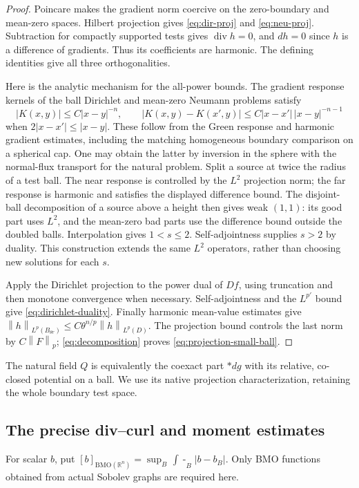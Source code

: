 \documentclass[reqno,11pt]{amsart}
\numberwithin{equation}{section}
\theoremstyle{definition}
\theoremstyle{remark}
\newcommand{\R}{\mathbb R}
\newcommand{\BMO}{\mathrm{BMO}}
\newcommand{\diver}{\operatorname{div}}
\newcommand{\fint}{\mathop{\int\!\!\!\!-}}
\newcommand{\norm}[1]{\left\lVert#1\right\rVert}
\begin{document}
\begin{proof}
Poincare makes the gradient norm coercive on the zero-boundary and
mean-zero spaces. Hilbert projection gives \eqref{eq:dir-proj} and
\eqref{eq:neu-proj}. Subtraction for compactly supported tests gives
$\diver h=0$, and $dh=0$ since $h$ is a difference of gradients.
Thus its coefficients are harmonic. The defining identities give all
three orthogonalities.

Here is the analytic mechanism for the all-power bounds. The gradient
response kernels of the ball Dirichlet and mean-zero Neumann problems
satisfy
\[
 |K(x,y)|\leq C|x-y|^{-n},\qquad
 |K(x,y)-K(x',y)|\leq C|x-x'|\,|x-y|^{-n-1}
\]
when $2|x-x'|\leq|x-y|$. These follow from the Green response and
harmonic gradient estimates, including the matching homogeneous boundary
comparison on a spherical cap. One may obtain the latter by inversion
in the sphere with the normal-flux transport for the natural problem.
Split a source at twice the radius of a test ball. The near response is
controlled by the $L^2$ projection norm; the far response is harmonic
and satisfies the displayed difference bound. The disjoint-ball
decomposition of a source above a height then gives weak $(1,1)$:
its good part uses $L^2$, and the mean-zero bad parts use the difference
bound outside the doubled balls. Interpolation gives $1<s\leq2$.
Self-adjointness supplies $s>2$ by duality. This construction extends
the same $L^2$ operators, rather than choosing new solutions for each $s$.

Apply the Dirichlet projection to the power dual of $Df$, using
truncation and then monotone convergence when necessary. Self-adjointness
and the $L^{p'}$ bound give \eqref{eq:dirichlet-duality}.
Finally harmonic mean-value estimates give
$\norm h_{L^p(B_{\theta r})}\leq C\theta^{n/p}\norm h_{L^p(D)}$.
The projection bound controls the last norm by $C\norm F_p$;
\eqref{eq:decomposition} proves \eqref{eq:projection-small-ball}.
\end{proof}

The natural field $Q$ is equivalently the coexact part $*dg$ with its
relative, co-closed potential on a ball. We use its native projection
characterization, retaining the whole boundary test space.

\subsection{The precise div--curl and moment estimates}\label{sec:compensation}
For scalar $b$, put
$[b]_{\BMO(\R^n)}=\sup_B\fint_B|b-b_B|$. Only BMO functions
obtained from actual Sobolev graphs are required here.
\end{document}
